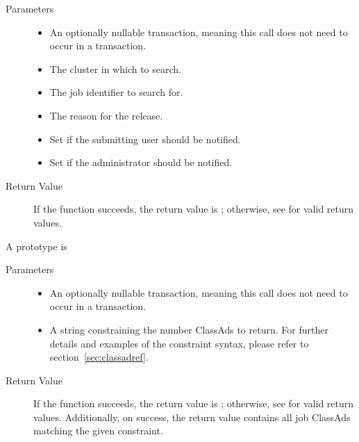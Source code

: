 \begin{description}
  \begin{description}
    \item[ Parameters]
    \begin{itemize}
      \item {} 
      An optionally nullable transaction, meaning this call does not 
      need to occur in a transaction. 
      \item {} The cluster in which to search.
      \item {} The job identifier to search for.
      \item {} The reason for the release.
      \item {}
      Set if the submitting user should be notified.
      \item {}
      Set if the administrator should be notified.
    \end{itemize}
    \item[ Return Value]
      If the function succeeds, the return value is ; 
      otherwise, see  for valid return values.
  \end{description} 


\item [\Code{getJobAds}]
  A prototype is 


  \begin{description}
    \item[ Parameters]
    \begin{itemize}
      \item {} 
      An optionally nullable transaction, meaning this call does not 
      need to occur in a transaction. 
      \item {} 
      A string constraining the number ClassAds to return. For further details 
      and examples of the constraint syntax, please refer to 
      section~\ref{sec:classadref}.
    \end{itemize}
    \item[ Return Value]
      If the function succeeds, the return value is ; 
      otherwise, see  for valid return values. Additionally,
      on success, the return value contains all job ClassAds matching the 
      given constraint.
  \end{description}     
  

\end{description}
